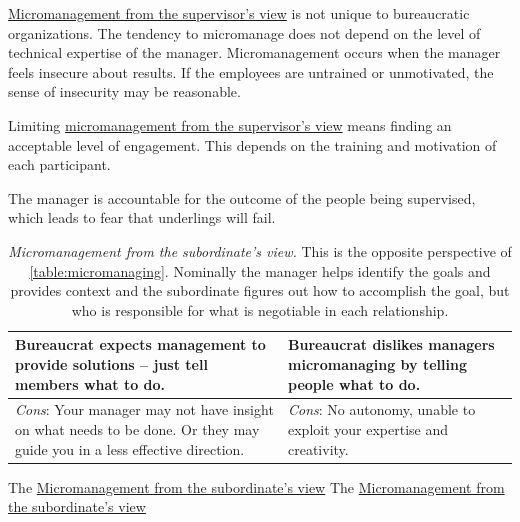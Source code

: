 \href{table:micromanaging}{Micromanagement from the supervisor's view} is not unique to bureaucratic organizations. The tendency to micromanage does not depend on the level of technical expertise of the manager. Micromanagement occurs when the manager feels insecure about results. If the employees are untrained or unmotivated, the sense of insecurity may be reasonable.

Limiting \href{table:micromanaging}{micromanagement from the supervisor's view} means finding an acceptable level of engagement. This depends on the training and motivation of each participant. 

The manager is accountable for the outcome of the people being supervised, which leads to fear that underlings will fail. 

\begin{center}
\begin{table}[H] %
\begin{tabular}{ | m{\dilemmatablewidth}| m{\dilemmatablewidth} | } 
  \hline
  \textbf{Bureaucrat expects management to provide solutions -- just tell members what to do.} & 
  \textbf{Bureaucrat dislikes managers micromanaging by telling people what to do.} \\ 
  \hline
  \textit{Cons}: Your manager may not have insight on what needs to be done. Or they may guide you in a less effective direction. &
  \textit{Cons}: No autonomy, unable to exploit your expertise and creativity. \\  
  \hline
\end{tabular}
\caption{\textit{Micromanagement from the subordinate's view.}
This is the opposite perspective of \ref{table:micromanaging}. Nominally the manager helps identify the goals and provides context and the subordinate figures out how to accomplish the goal, but who is responsible for what is negotiable in each relationship.
}
\label{table:solution_provider}
\end{table}
\end{center}

The \href{table:solution_provider}{Micromanagement from the subordinate's view}
The \href{table:solution_provider}{Micromanagement from the subordinate's view}
  

